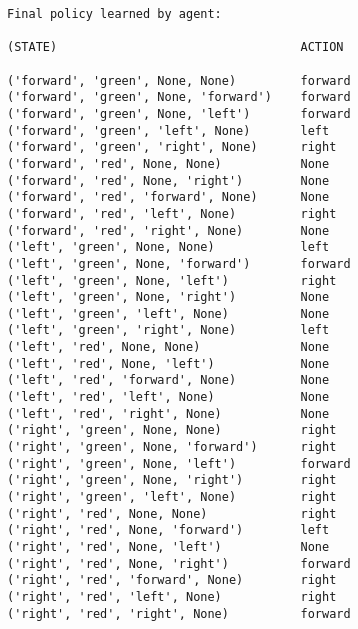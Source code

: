 \documentclass{article}
\begin{document}
\begin{verbatim}
Final policy learned by agent:

(STATE)                                  ACTION              

('forward', 'green', None, None)         forward             
('forward', 'green', None, 'forward')    forward             
('forward', 'green', None, 'left')       forward             
('forward', 'green', 'left', None)       left                
('forward', 'green', 'right', None)      right               
('forward', 'red', None, None)           None                
('forward', 'red', None, 'right')        None                
('forward', 'red', 'forward', None)      None                
('forward', 'red', 'left', None)         right               
('forward', 'red', 'right', None)        None                
('left', 'green', None, None)            left                
('left', 'green', None, 'forward')       forward             
('left', 'green', None, 'left')          right               
('left', 'green', None, 'right')         None                
('left', 'green', 'left', None)          None                
('left', 'green', 'right', None)         left                
('left', 'red', None, None)              None                
('left', 'red', None, 'left')            None                
('left', 'red', 'forward', None)         None                
('left', 'red', 'left', None)            None                
('left', 'red', 'right', None)           None                
('right', 'green', None, None)           right               
('right', 'green', None, 'forward')      right               
('right', 'green', None, 'left')         forward             
('right', 'green', None, 'right')        right               
('right', 'green', 'left', None)         right               
('right', 'red', None, None)             right               
('right', 'red', None, 'forward')        left                
('right', 'red', None, 'left')           None                
('right', 'red', None, 'right')          forward             
('right', 'red', 'forward', None)        right               
('right', 'red', 'left', None)           right               
('right', 'red', 'right', None)          forward             

\end{verbatim}
\end{document}
